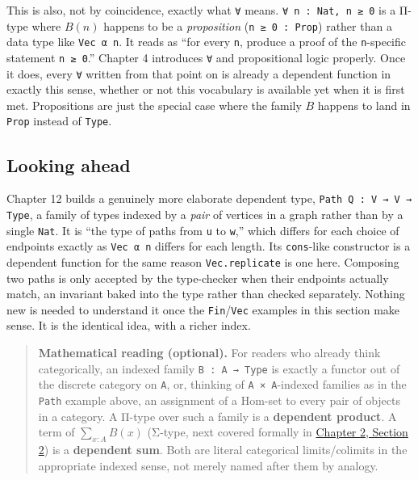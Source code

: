 This is also, not by coincidence, exactly what \texttt{∀} means. \texttt{∀ n : Nat, n ≥ 0} is a Π-type where \(B(n)\) happens to be a \emph{proposition} (\texttt{n ≥ 0 : Prop}) rather than a data type like \texttt{Vec α n}. It reads as ``for every \texttt{n}, produce a proof of the \texttt{n}-specific statement \texttt{n ≥ 0}.'' Chapter 4 introduces \texttt{∀} and propositional logic properly. Once it does, every \texttt{∀} written from that point on is already a dependent function in exactly this sense, whether or not this vocabulary is available yet when it is first met. Propositions are just the special case where the family \(B\) happens to land in \texttt{Prop} instead of \texttt{Type}.

\subsection{Looking ahead}\label{sec:01-basics:03-dependent-types:7}

Chapter 12 builds a genuinely more elaborate dependent type, \texttt{Path Q : V → V → Type}, a family of types indexed by a \emph{pair} of vertices in a graph rather than by a single \texttt{Nat}. It is ``the type of paths from \texttt{u} to \texttt{w},'' which differs for each choice of endpoints exactly as \texttt{Vec α n} differs for each length. Its \texttt{cons}-like constructor is a dependent function for the same reason \texttt{Vec.replicate} is one here. Composing two paths is only accepted by the type-checker when their endpoints actually match, an invariant baked into the type rather than checked separately. Nothing new is needed to understand it once the \texttt{Fin}/\texttt{Vec} examples in this section make sense. It is the identical idea, with a richer index.

\begin{quote}
\textbf{Mathematical reading (optional).} For readers who already think categorically, an indexed family \texttt{B : A → Type} is exactly a functor out of the discrete category on \texttt{A}, or, thinking of \texttt{A × A}-indexed families as in the \texttt{Path} example above, an assignment of a \(\mathrm{Hom}\)-set to every pair of objects in a category. A Π-type over such a family is a \textbf{dependent product}. A term of \(\sum_{x:A} B(x)\) (Σ-type, next covered formally in \hyperref[sec:02-terminology-and-coc:02-pi-sigma-and-coc:1]{Chapter 2, Section 2}) is a \textbf{dependent sum}. Both are literal categorical limits/colimits in the appropriate indexed sense, not merely named after them by analogy.
\end{quote}

